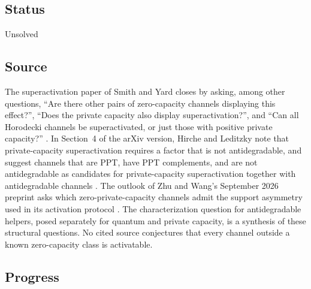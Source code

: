 \subsection*{Status}

Unsolved

\subsection*{Source}

The superactivation paper of Smith and Yard closes by asking, among other questions, ``Are there other pairs of zero-capacity channels displaying this effect?'', ``Does the private capacity also display superactivation?'', and ``Can all Horodecki channels be superactivated, or just those with positive private capacity?'' . In Section~4 of the arXiv version, Hirche and Leditzky note that private-capacity superactivation requires a factor that is not antidegradable, and suggest channels that are PPT, have PPT complements, and are not antidegradable as candidates for private-capacity superactivation together with antidegradable channels . The outlook of Zhu and Wang's September 2026 preprint asks which zero-private-capacity channels admit the support asymmetry used in its activation protocol . The characterization question for antidegradable helpers, posed separately for quantum and private capacity, is a synthesis of these structural questions. No cited source conjectures that every channel outside a known zero-capacity class is activatable.

\subsection*{Progress}

